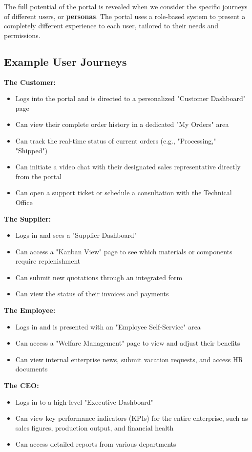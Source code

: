 The full potential of the portal is revealed when we consider the specific journeys of different users, or \textbf{personas}. The portal uses a role-based system to present a completely different experience to each user, tailored to their needs and permissions.

\subsection{Example User Journeys}

\textbf{The Customer:}
\begin{itemize}
	\item Logs into the portal and is directed to a personalized "Customer Dashboard" page
	\item Can view their complete order history in a dedicated "My Orders" area
	\item Can track the real-time status of current orders (e.g., "Processing," "Shipped")
	\item Can initiate a video chat with their designated sales representative directly from the portal
	\item Can open a support ticket or schedule a consultation with the Technical Office
\end{itemize}

\textbf{The Supplier:}
\begin{itemize}
	\item Logs in and sees a "Supplier Dashboard"
	\item Can access a "Kanban View" page to see which materials or components require replenishment
	\item Can submit new quotations through an integrated form
	\item Can view the status of their invoices and payments
\end{itemize}

\textbf{The Employee:}
\begin{itemize}
	\item Logs in and is presented with an "Employee Self-Service" area
	\item Can access a "Welfare Management" page to view and adjust their benefits
	\item Can view internal enterprise news, submit vacation requests, and access HR documents
\end{itemize}

\textbf{The CEO:}
\begin{itemize}
	\item Logs in to a high-level "Executive Dashboard"
	\item Can view key performance indicators (KPIs) for the entire enterprise, such as sales figures, production output, and financial health
	\item Can access detailed reports from various departments
\end{itemize}


